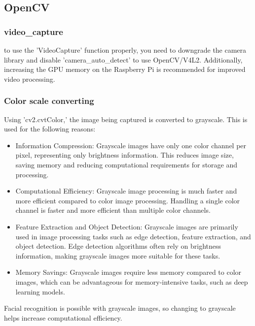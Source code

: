 \subsection{\textbf{OpenCV}}
\subsubsection{\textbf{video\_capture}}
 to use the 'VideoCapture' function properly, you need to downgrade the camera library and disable 'camera\_auto\_detect' to use OpenCV/V4L2. Additionally, increasing the GPU memory on the Raspberry Pi is recommended for improved video processing.\\

 \subsubsection{\textbf{Color scale converting}}
Using 'cv2.cvtColor,' the image being captured is converted to grayscale. This is used for the following reasons:\\

\begin{itemize}
\item Information Compression: Grayscale images have only one color channel per pixel, representing only brightness information. This reduces image size, saving memory and reducing computational requirements for storage and processing.\\
\item Computational Efficiency: Grayscale image processing is much faster and more efficient compared to color image processing. Handling a single color channel is faster and more efficient than multiple color channels.\\
\item Feature Extraction and Object Detection: Grayscale images are primarily used in image processing tasks such as edge detection, feature extraction, and object detection. Edge detection algorithms often rely on brightness information, making grayscale images more suitable for these tasks.\\
\item Memory Savings: Grayscale images require less memory compared to color images, which can be advantageous for memory-intensive tasks, such as deep learning models.\\
\end{itemize}

Facial recognition is possible with grayscale images, so changing to grayscale helps increase computational efficiency.\\

